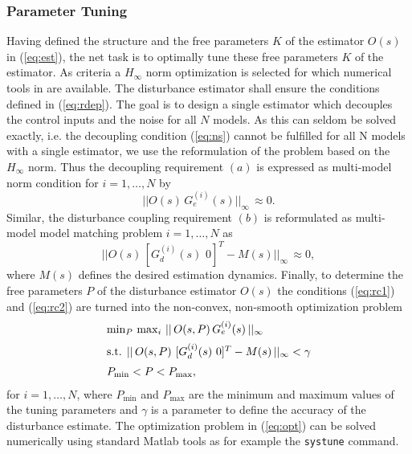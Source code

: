 \documentclass[graybox]{svmult}
\begin{document}
\subsubsection{Parameter Tuning}\label{sec:tuning}
Having defined the structure and the free parameters $K$ of the estimator $O(s)$ in (\ref{eq:est}), the net task is to optimally tune these free parameters $K$ of the estimator. As criteria a $H_\infty$ norm optimization is selected for which numerical tools in \matlab are available. The disturbance estimator shall ensure the conditions defined in (\ref{eq:rdep}). The goal is to design a single estimator which decouples the control inputs and the noise for all $N$ models. As this can seldom be solved exactly, i.e. the decoupling condition (\ref{eq:ns}) cannot be fulfilled for all N models with a single estimator, we use the reformulation of the problem based on the $H_\infty$ norm. Thus the decoupling requirement $(a)$ is expressed as  multi-model norm condition for  $i=1,\dots,N$ by
\begin{equation}\label{eq:rc1}
||O(s) \, G_e^{(i)}(s) ||_\infty  \,\approx 0.
\end{equation}
Similar, the disturbance coupling requirement $(b)$ is reformulated as multi-model model matching problem  $i=1,\dots,N$ as
\begin{equation}\label{eq:rc2}
|| O(s) \, [ G_d^{(i)}(s) \,\, 0 ]^T - M(s) ||_\infty \,\approx 0,
\end{equation}
where $M(s)$ defines the desired estimation dynamics. Finally, to determine the free parameters $P$ of the disturbance estimator $O(s)$ the conditions (\ref{eq:rc1}) and (\ref{eq:rc2}) are turned into the non-convex, non-smooth optimization problem
\begin{equation} \label{eq:opt}
\begin{array}{l}
\min_{P} \, \max_{i} \, || \, O(s,P) \, G_e^{(i)}(s) \, ||_\infty \vspace{+2mm} \\
\textnormal{s.t. } ||\, O(s,P) \,\, [ G_d^{(i)}(s) \,\, 0 ]^T - M(s) \, ||_\infty < \gamma \vspace{+2mm} \\
P_{\min} < P < P_{\max},
\end{array}
\end{equation}
for $i=1,\dots,N$, where $P_{\min}$ and $P_{\max}$ are the minimum and maximum values of the tuning parameters and $\gamma$ is a parameter to define the accuracy of the disturbance estimate. The optimization problem in (\ref{eq:opt}) can be  solved numerically using standard Matlab tools as for example the \texttt{systune} command.
\end{document}
